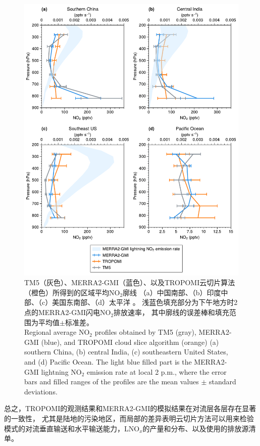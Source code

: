 \begin{figure}[htbp]
    \centering
    \includegraphics[width=15cm]{./figures/utno2_profile.pdf}
    \caption{
    TM5（灰色）、MERRA2-GMI（蓝色）、以及TROPOMI云切片算法（橙色）所得到的区域平均NO$_2$廓线
    （a）中国南部、（b）印度中部、（c）美国东南部、（d）太平洋 。
    浅蓝色填充部分为下午地方时2点的MERRA2-GMI闪电NO$_2$排放速率，
    其中廓线的误差棒和填充范围为平均值$\pm$标准差。\\
    Regional average NO$_2$ profiles obtained by TM5 (gray), MERRA2-GMI (blue), and TROPOMI cloud slice algorithm (orange)
    (a) southern China, (b) central India, (c) southeastern United States, and (d) Pacific Ocean.
    The light blue filled part is the MERRA2-GMI lightning NO$_2$ emission rate at local 2 p.m.,
    where the error bars and filled ranges of the profiles are the mean values $\pm$ standard deviations.
    }
    \label{fig:utno2_profile}
\end{figure}

总之，TROPOMI的观测结果和MERRA2-GMI的模拟结果在对流层各层存在显著的一致性，
尤其是陆地的污染地区，而局部的差异表明云切片方法可以用来检验模式的对流垂直输送和水平输送能力，LNO$_x$的产量和分布、以及使用的排放源清单。






